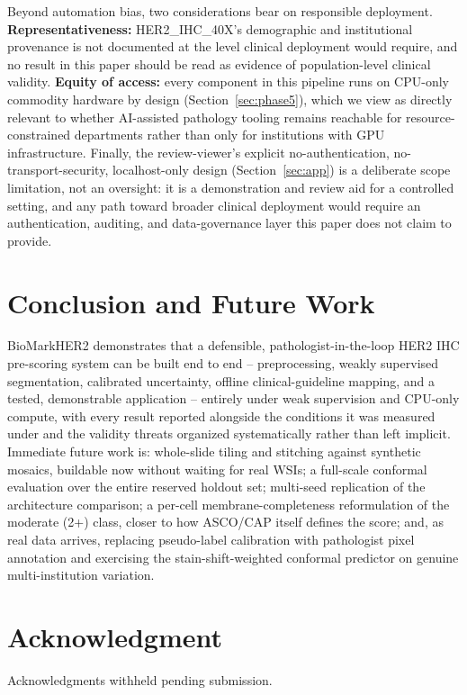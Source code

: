 \documentclass[conference]{IEEEtran}
\begin{document}
Beyond automation bias, two considerations bear on responsible deployment.
\textbf{Representativeness:} HER2\_IHC\_40X's demographic and
institutional provenance is not documented at the level clinical
deployment would require, and no result in this paper should be read as
evidence of population-level clinical validity. \textbf{Equity of
access:} every component in this pipeline runs on CPU-only commodity
hardware by design (Section~\ref{sec:phase5}), which we view as directly
relevant to whether AI-assisted pathology tooling remains reachable for
resource-constrained departments rather than only for institutions with
GPU infrastructure. Finally, the review-viewer's explicit no-authentication,
no-transport-security, localhost-only design (Section~\ref{sec:app}) is a
deliberate scope limitation, not an oversight: it is a demonstration and
review aid for a controlled setting, and any path toward broader clinical
deployment would require an authentication, auditing, and data-governance
layer this paper does not claim to provide.

\section{Conclusion and Future Work}

BioMarkHER2 demonstrates that a defensible, pathologist-in-the-loop HER2
IHC pre-scoring system can be built end to end -- preprocessing, weakly
supervised segmentation, calibrated uncertainty, offline clinical-guideline
mapping, and a tested, demonstrable application -- entirely under weak
supervision and CPU-only compute, with every result reported alongside the
conditions it was measured under and the validity threats organized
systematically rather than left implicit. Immediate future work is:
whole-slide tiling and stitching against synthetic mosaics, buildable now
without waiting for real WSIs; a full-scale conformal evaluation over the
entire reserved holdout set; multi-seed replication of the architecture
comparison; a per-cell membrane-completeness reformulation of the
moderate (2+) class, closer to how ASCO/CAP itself defines the score; and,
as real data arrives, replacing pseudo-label calibration with pathologist
pixel annotation and exercising the stain-shift-weighted conformal
predictor on genuine multi-institution variation.

\section*{Acknowledgment}
Acknowledgments withheld pending submission.
\end{document}
